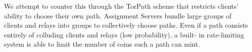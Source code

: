 We attempt to counter this through the TorPath scheme that restricts clients'
ability to choose their own path. Assignment Servers bundle large groups of
clients and relays into groups to collectively choose paths. Even if a path
consists entirely of colluding clients and relays (low probability), a built-
in rate-limiting system is able to limit the number of coins such a path can
mint.








